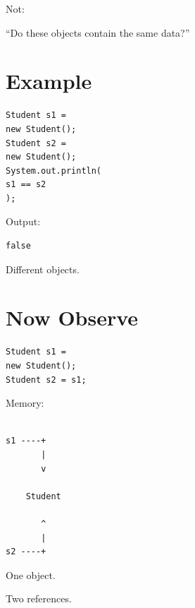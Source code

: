 \documentclass[11pt,a4paper]{book}
\begin{document}
Not:


``Do these objects contain
the same data?''


\section{Example}

\begin{verbatim} 
Student s1 =
new Student();
Student s2 =
new Student();
System.out.println(
s1 == s2
);
\end{verbatim}


Output:

\begin{verbatim}
false
\end{verbatim}


Different objects.


\section{Now Observe}

\begin{verbatim} 
Student s1 =
new Student();
Student s2 = s1;
\end{verbatim}


Memory:

\begin{verbatim}

s1 ----+
       |
       v

    Student

       ^
       |
s2 ----+

\end{verbatim}


One object.


Two references.
\end{document}
